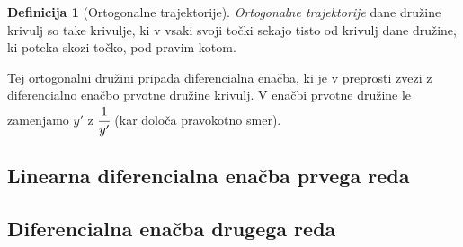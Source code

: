 \documentclass[11pt]{article}
\theoremstyle{definition}
\newtheorem{definicija}{Definicija}[section]
\theoremstyle{definition}
\theoremstyle{definition}
\theoremstyle{theorem}
\begin{document}
\begin{definicija}[Ortogonalne trajektorije]

\textit{Ortogonalne trajektorije} dane družine krivulj so take krivulje, ki v vsaki svoji točki sekajo tisto od krivulj dane družine, ki poteka skozi točko, pod pravim kotom.

Tej ortogonalni družini pripada diferencialna enačba, ki je v preprosti zvezi z diferencialno enačbo prvotne družine krivulj. V enačbi prvotne družine le zamenjamo $y'$ z $\cfrac{1}{y'}$ (kar določa pravokotno smer).

\end{definicija}
\vspace{0.5cm}


\subsection{Linearna diferencialna enačba prvega reda}
\vspace{0.5cm}


\subsection{Diferencialna enačba drugega reda}
\vspace{0.5cm}


\pagebreak

\end{document}
